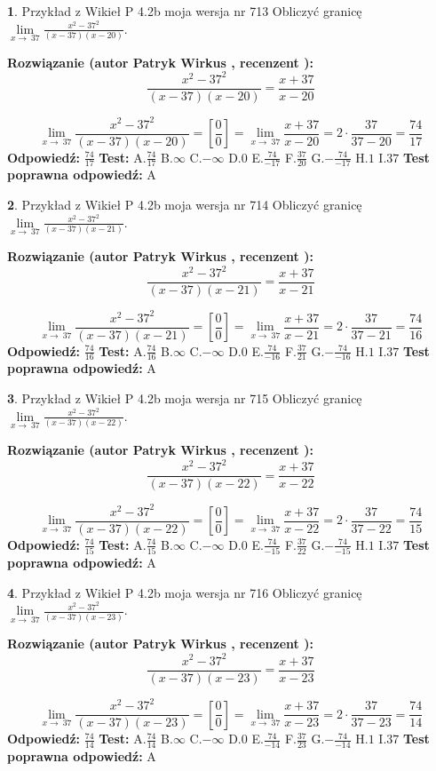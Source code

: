 \documentclass[12pt, a4paper]{article}
\theoremstyle{definition} %
\newtheorem{zad}{}
\newcommand{\zadStart}[1]{\begin{zad}#1\newline}
\newcommand{\zadStop}{\end{zad}}
\newcommand{\rozwStart}[2]{\noindent \textbf{Rozwiązanie (autor #1 , recenzent #2): }\newline}
\newcommand{\rozwStop}{\newline}
\newcommand{\odpStart}{\noindent \textbf{Odpowiedź:}\newline}
\newcommand{\odpStop}{\newline}
\newcommand{\testStart}{\noindent \textbf{Test:}\newline}
\newcommand{\testStop}{\newline}
\newcommand{\kluczStart}{\noindent \textbf{Test poprawna odpowiedź:}\newline}
\newcommand{\kluczStop}{\newline}
\begin{document}
\zadStart{Przykład z Wikieł P 4.2b moja wersja nr 713}
Obliczyć granicę $\lim\limits_{x\to\ 37}\frac{x^{2}-37^{2}}{(x-37)(x-20)}$.
\zadStop
\rozwStart{Patryk Wirkus}{}
$$\frac{x^{2}-37^{2}}{(x-37)(x-20)}=\frac{x+37}{x-20}$$

$$\lim\limits_{x\to\ 37}\frac{x^{2}-37^{2}}{(x-37)(x-20)}=[\frac{0}{0}]=\lim\limits_{x\to\ 37}\frac{x+37}{x-20}=2 \cdot \frac{37}{37-20} = \frac{74}{17}$$
\rozwStop
\odpStart
$\frac{74}{17}$
\odpStop
\testStart
A.$\frac{74}{17}$
B.$\infty$
C.$-\infty$
D.$0$
E.$\frac{74}{-17}$
F.$\frac{37}{20}$
G.$-\frac{74}{-17}$
H.$1$
I.$37$
\testStop
\kluczStart
A
\kluczStop



\zadStart{Przykład z Wikieł P 4.2b moja wersja nr 714}
Obliczyć granicę $\lim\limits_{x\to\ 37}\frac{x^{2}-37^{2}}{(x-37)(x-21)}$.
\zadStop
\rozwStart{Patryk Wirkus}{}
$$\frac{x^{2}-37^{2}}{(x-37)(x-21)}=\frac{x+37}{x-21}$$

$$\lim\limits_{x\to\ 37}\frac{x^{2}-37^{2}}{(x-37)(x-21)}=[\frac{0}{0}]=\lim\limits_{x\to\ 37}\frac{x+37}{x-21}=2 \cdot \frac{37}{37-21} = \frac{74}{16}$$
\rozwStop
\odpStart
$\frac{74}{16}$
\odpStop
\testStart
A.$\frac{74}{16}$
B.$\infty$
C.$-\infty$
D.$0$
E.$\frac{74}{-16}$
F.$\frac{37}{21}$
G.$-\frac{74}{-16}$
H.$1$
I.$37$
\testStop
\kluczStart
A
\kluczStop



\zadStart{Przykład z Wikieł P 4.2b moja wersja nr 715}
Obliczyć granicę $\lim\limits_{x\to\ 37}\frac{x^{2}-37^{2}}{(x-37)(x-22)}$.
\zadStop
\rozwStart{Patryk Wirkus}{}
$$\frac{x^{2}-37^{2}}{(x-37)(x-22)}=\frac{x+37}{x-22}$$

$$\lim\limits_{x\to\ 37}\frac{x^{2}-37^{2}}{(x-37)(x-22)}=[\frac{0}{0}]=\lim\limits_{x\to\ 37}\frac{x+37}{x-22}=2 \cdot \frac{37}{37-22} = \frac{74}{15}$$
\rozwStop
\odpStart
$\frac{74}{15}$
\odpStop
\testStart
A.$\frac{74}{15}$
B.$\infty$
C.$-\infty$
D.$0$
E.$\frac{74}{-15}$
F.$\frac{37}{22}$
G.$-\frac{74}{-15}$
H.$1$
I.$37$
\testStop
\kluczStart
A
\kluczStop



\zadStart{Przykład z Wikieł P 4.2b moja wersja nr 716}
Obliczyć granicę $\lim\limits_{x\to\ 37}\frac{x^{2}-37^{2}}{(x-37)(x-23)}$.
\zadStop
\rozwStart{Patryk Wirkus}{}
$$\frac{x^{2}-37^{2}}{(x-37)(x-23)}=\frac{x+37}{x-23}$$

$$\lim\limits_{x\to\ 37}\frac{x^{2}-37^{2}}{(x-37)(x-23)}=[\frac{0}{0}]=\lim\limits_{x\to\ 37}\frac{x+37}{x-23}=2 \cdot \frac{37}{37-23} = \frac{74}{14}$$
\rozwStop
\odpStart
$\frac{74}{14}$
\odpStop
\testStart
A.$\frac{74}{14}$
B.$\infty$
C.$-\infty$
D.$0$
E.$\frac{74}{-14}$
F.$\frac{37}{23}$
G.$-\frac{74}{-14}$
H.$1$
I.$37$
\testStop
\kluczStart
A
\kluczStop
\end{document}
